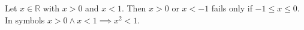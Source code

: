 Let $x \in \mathbb{R}$ with $x > 0$ and $x < 1$.
Then $x > 0$ or $x < -1$ fails only if $-1 \leq x \leq 0$.
In symbols $x > 0 \land x < 1 \implies x^{2} < 1$.
